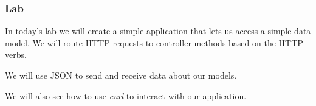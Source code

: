 \documentclass[10pt]{beamer}
\begin{document}
\begin{frame}
  \frametitle{Lab}
  In today's lab we will create a simple application that lets us access a
  simple data model. We will route HTTP requests to controller methods based
  on the HTTP verbs.
  
  \vspace{1\baselineskip}
  We will use JSON to send and receive data about our models.
  
  \vspace{1\baselineskip}
  We will also see how to use \emph{curl} to interact with our application.

\end{frame}
\end{document}
